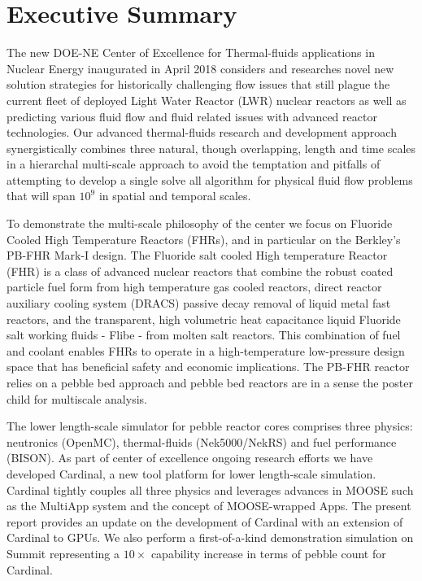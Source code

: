 
\section*{Executive Summary}

The new DOE-NE Center of Excellence for Thermal-fluids applications in Nuclear Energy inaugurated in
April 2018 considers and researches novel new solution strategies for historically challenging
flow issues that still plague the current  fleet of deployed Light Water Reactor (LWR) nuclear reactors as well as predicting various fluid flow and  fluid related issues with advanced reactor technologies. Our advanced thermal-fluids research and development approach synergistically combines three natural, though overlapping, length and time scales in a hierarchal multi-scale approach to avoid the temptation and pitfalls of attempting to develop a single solve all algorithm for physical  fluid flow problems that will span $10^9$ in spatial and temporal scales.

To demonstrate the multi-scale philosophy of the center we focus on Fluoride Cooled High
Temperature Reactors (FHRs), and in particular on the Berkley's PB-FHR Mark-I design. The
Fluoride salt cooled High temperature Reactor (FHR) is a class of advanced nuclear reactors that combine the
robust coated particle fuel form from high temperature gas cooled reactors, direct reactor auxiliary cooling
system (DRACS) passive decay removal of liquid metal fast reactors, and the transparent, high volumetric heat capacitance liquid Fluoride salt working fluids - Flibe - from molten salt reactors. This combination of fuel and coolant enables FHRs to operate in a high-temperature low-pressure design space that has beneficial safety and economic implications. The PB-FHR reactor relies on a pebble bed approach and pebble bed reactors are in a sense the poster child for multiscale analysis.

The lower length-scale simulator for pebble reactor cores comprises three physics: neutronics (OpenMC),
thermal-fluids (Nek5000/NekRS) and fuel performance (BISON). As part of center of excellence ongoing research efforts we have developed Cardinal, a new tool platform for lower length-scale simulation. Cardinal tightly couples all three physics and leverages advances in MOOSE such as the MultiApp system and the concept of MOOSE-wrapped Apps. The present report provides an update on the development of Cardinal with an extension of Cardinal to GPUs. We also perform a first-of-a-kind demonstration simulation on Summit representing a $10\times$ capability increase in terms of pebble count for Cardinal.
